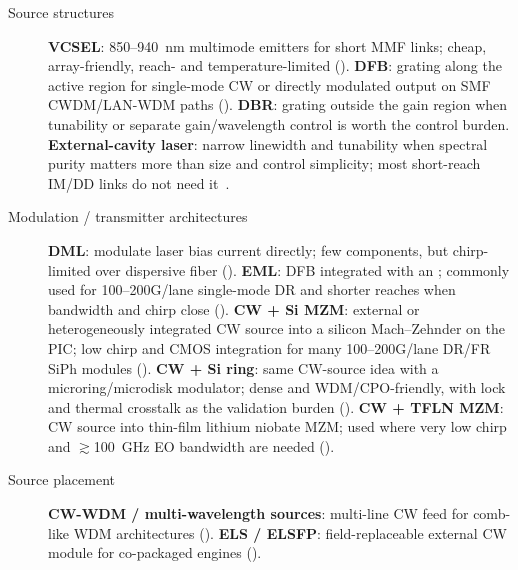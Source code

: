 \begin{description}
\item[Source structures]
      \textbf{VCSEL}: 850--940~nm multimode emitters for short
      MMF links; cheap, array-friendly, reach- and temperature-limited
      ().
      \textbf{DFB}: grating along the active region for single-mode CW or
      directly modulated output on SMF CWDM/LAN-WDM paths ().
      \textbf{DBR}: grating outside the gain region when tunability
      or separate gain/wavelength control is worth the control burden.
      \textbf{External-cavity laser}: narrow linewidth and tunability when
      spectral purity matters more than size and control simplicity; most
      short-reach IM/DD links do not need it~\cite{eclplanex}.
\item[Modulation / transmitter architectures]
      \textbf{DML}: modulate laser bias current directly; few
      components, but chirp-limited over dispersive fiber ().
      \textbf{EML}: DFB integrated with an ;
      commonly used for 100--200G/lane single-mode DR and shorter reaches when
      bandwidth and chirp close ().
      \textbf{CW + Si MZM}: external or heterogeneously integrated CW source into
      a silicon Mach--Zehnder on the PIC; low chirp and CMOS integration for
      many 100--200G/lane DR/FR SiPh modules ().
      \textbf{CW + Si ring}: same CW-source idea with a microring/microdisk
      modulator; dense and WDM/CPO-friendly, with lock and thermal crosstalk as
      the validation burden ().
      \textbf{CW + TFLN MZM}: CW source into thin-film lithium niobate MZM;
      used where very low chirp and $\gtrsim$100~GHz EO bandwidth are needed
      ().
\item[Source placement]
      \textbf{CW-WDM / multi-wavelength sources}: multi-line CW feed for comb-like
      WDM architectures ().
      \textbf{ELS / ELSFP}: field-replaceable external CW module for co-packaged
      engines ().
\end{description}

